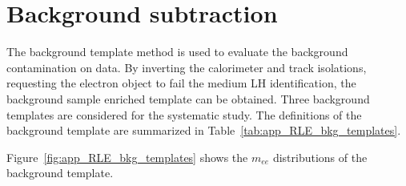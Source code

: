 \section{Background subtraction}
\label{sec:app_RLE_bkg_subtraction}
The background template method is used to evaluate the background contamination on data.
By inverting the calorimeter and track isolations, requesting the electron object to fail the medium LH identification, the background sample enriched template can be obtained.
Three background templates are considered for the systematic study.
The definitions of the background template are summarized in Table~\ref{tab:app_RLE_bkg_templates}.
%
\begin{table}[htb]
    \caption{The definition of the background templates for estimating the background contamination associated with the $Z$ tag-and-probe method.
    The baseline template is used to estimate the background contamination.
    The variation 1 template has looser requirements and the variation 2 template has tighter requirements.
    They are used to assess the systematic caused by the background contamination.}
    \label{tab:app_RLE_bkg_templates}
\end{table}
%
Figure~\ref{fig:app_RLE_bkg_templates} shows the $m_{ee}$ distributions of the background template.
%
